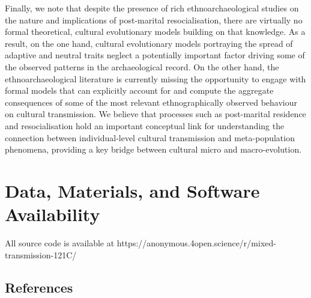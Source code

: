 \documentclass[9pt,twocolumn,twoside,lineno]{pnas-new}
\begin{document}
Finally, we note that despite the presence of rich ethnoarchaeological studies on the nature and implications of post-marital resocialisation, there are virtually no formal theoretical, cultural evolutionary models building on that knowledge.  
As a result, on the one hand, cultural evolutionary models portraying the spread of adaptive and neutral traits neglect a potentially important factor driving some of the observed patterns in the archaeological record. On the other hand, the ethnoarchaeological literature is currently missing the opportunity to engage with formal models that can explicitly account for and compute the aggregate consequences of some of the most relevant ethnographically observed behaviour on cultural transmission. 
We believe that processes such as post-marital residence and resocialisation hold an important conceptual link for understanding the connection between individual-level cultural transmission and meta-population phenomena, providing a key bridge between cultural micro and macro-evolution.  

\section*{Data, Materials, and Software Availability}
All source code is available at https://anonymous.4open.science/r/mixed-transmission-121C/




\subsection*{References}

\end{document}

